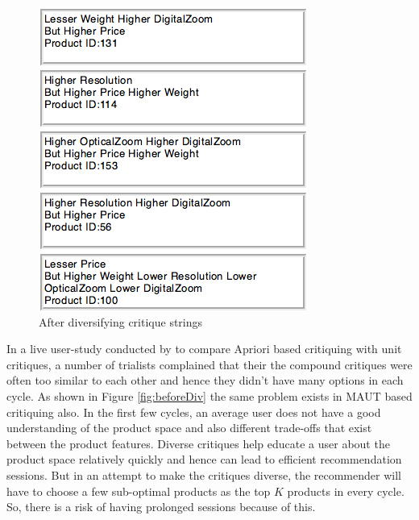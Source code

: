 \begin{figure}
\begin{minipage}{.45\textwidth}
  \includegraphics[width=1\linewidth]{figures-bharath/diversity2.jpg}
  \caption{After diversifying critique strings}
  \label{fig:afterDiv}
\end{minipage}
\end{figure}

In a live user-study conducted by \cite{aprioriUserStudy} to compare Apriori based critiquing with unit critiques, a number of trialists complained that their the compound critiques were often too similar to each other and hence they didn't have many options in each cycle.
As shown in Figure \ref{fig:beforeDiv} the same problem exists in MAUT based critiquing also.
In the first few cycles, an average user does not have a good understanding of the product space and also different trade-offs that exist between the product features.
Diverse critiques help educate a user about the product space relatively quickly and hence can lead to efficient recommendation sessions.
But in an attempt to make the critiques diverse, the recommender will have to choose a few sub-optimal products as the top $K$ products in every cycle.
So, there is a risk of having prolonged sessions because of this.

